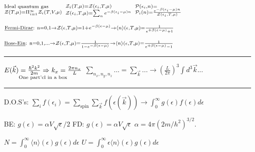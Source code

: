 \documentclass{article}
\newcommand{\YgorUD}[2]{\,\!^{#1}_{#2}}
\begin{document}
\begin{multicols}{2}
$\YgorUD{%
            \text{Ideal quantum gas}%
        }{%
            \mathcal{Z} ( T  ,\mu )=\Pi_{i = 1}^{\infty} %
            \mathcal{Z}_{i} ( T  , V , \mu )   %
    }   $\hfill\textbullet\hfill%
    $   \YgorUD{%
            \mathcal{Z}_{i} ( T , \mu )=\mathcal{Z} ( \epsilon_{ i} , T  ,\mu )%
        }{%
            \mathcal{Z} ( \epsilon_{ i} , T  ,\mu )=%
            \sum_{ n}  e^{ - \beta( \epsilon_{ i} - \mu )n}%
    }    $\hfill\textbullet\hfill%
    $  \YgorUD{\mathcal{P} ( \epsilon_{ i} , n )=}{%
            \mathcal{P}_{ i} ( n )=%
            \smash{\frac{e^{ - \beta( \epsilon_{ i} - \mu )n}}{%
            \mathcal{Z} ( \epsilon_{ i} , T  ,\mu )}}%
    }$


$\YgorUD{%
        \text{\underline{Fermi-Dirac}: n=0,1}\rightarrow%
        \mathcal{Z} ( \epsilon , T  ,\mu )=%
        1 + e^{  - \beta( \epsilon - \mu )}%
        \rightarrow%
        \langle n \rangle ( \epsilon , T  ,\mu )=%
        \smash{\frac{1}{ e^{ + \beta( \epsilon - \mu )} + 1 }} %
     }{\,}$

$\YgorUD{%
        \text{\underline{Bose-Ein}: n=0,1,...}\rightarrow%
        \mathcal{Z} ( \epsilon , T  ,\mu )=%
        \smash{\frac{1}{ 1 - e^{  - \beta( \epsilon - \mu )} }} %
        \rightarrow%
        \langle n \rangle ( \epsilon , T  ,\mu )=%
        \smash{\frac{1}{ e^{  + \beta( \epsilon - \mu )} - 1 }} %
     }{\,}$
\hrule


$\underset{\text{One part'cl in a box}}{%
    E ( \vec{k} )  =  \frac{\hbar^{ 2}  k^{ 2}}{2m} \Rightarrow
    k_{ x}  =  \frac{2 \pi  n_{ x}}{L}}$%
    \hfill\textbullet\hfill%
    $\sum\limits_{n_{ x} , n_{ y} , n_{ z}}       ... =%
     \sum\limits_{\vec{k}}   ... \rightarrow %
     \left(  \frac{L}{2\pi}  \right)^{ 3}   \int   d^{3} \vec{k}  %
     ...$

\hrule

D.O.S's: $\sum_{i} f ( \epsilon_{ i} ) = \sum_{\text{spin}}\sum_{\vec{k}}%
         f ( \epsilon ( \vec{k} ) ) \rightarrow \int_{0}^{\infty}%
         g ( \epsilon ) f ( \epsilon ) d\epsilon$

BE: $g ( \epsilon )  =  \alpha  V   \sqrt{ \epsilon} / 2$%
    \textbullet%
    FD: $g ( \epsilon )  =  \alpha  V   \sqrt{ \epsilon}$%
    \textbullet%
    $\alpha  =  4\pi ( 2m / h^{2} )^{ 3 / 2}$.

$N=\int_{0}^{\infty} \langle n \rangle ( \epsilon ) g ( \epsilon )%
    d\epsilon$\textbullet%
    $U=\int_{0}^{\infty} \epsilon \langle n \rangle ( \epsilon )%
    g ( \epsilon ) d\epsilon$


\end{multicols}
\end{document}
